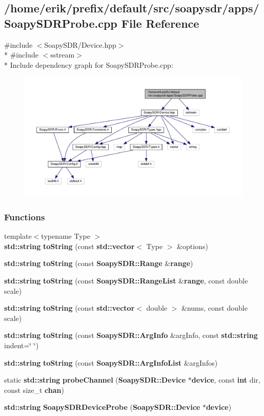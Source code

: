 \subsection{/home/erik/prefix/default/src/soapysdr/apps/\+Soapy\+S\+D\+R\+Probe.cpp File Reference}
\label{SoapySDRProbe_8cpp}
{\ttfamily \#include $<$Soapy\+S\+D\+R/\+Device.\+hpp$>$}\\*
{\ttfamily \#include $<$sstream$>$}\\*
Include dependency graph for Soapy\+S\+D\+R\+Probe.\+cpp\+:
\nopagebreak
\begin{figure}[H]
\begin{center}
\leavevmode
\includegraphics[width=350pt]{d6/d65/SoapySDRProbe_8cpp__incl}
\end{center}
\end{figure}
\subsubsection*{Functions}
\begin{DoxyCompactItemize}
\item 
{\footnotesize template$<$typename Type $>$ }\\{\bf std\+::string} {\bf to\+String} (const {\bf std\+::vector}$<$ Type $>$ \&options)
\item 
{\bf std\+::string} {\bf to\+String} (const {\bf Soapy\+S\+D\+R\+::\+Range} \&{\bf range})
\item 
{\bf std\+::string} {\bf to\+String} (const {\bf Soapy\+S\+D\+R\+::\+Range\+List} \&{\bf range}, const double scale)
\item 
{\bf std\+::string} {\bf to\+String} (const {\bf std\+::vector}$<$ double $>$ \&nums, const double scale)
\item 
{\bf std\+::string} {\bf to\+String} (const {\bf Soapy\+S\+D\+R\+::\+Arg\+Info} \&arg\+Info, const {\bf std\+::string} indent=\char`\"{}    \char`\"{})
\item 
{\bf std\+::string} {\bf to\+String} (const {\bf Soapy\+S\+D\+R\+::\+Arg\+Info\+List} \&arg\+Infos)
\item 
static {\bf std\+::string} {\bf probe\+Channel} ({\bf Soapy\+S\+D\+R\+::\+Device} $\ast${\bf device}, const {\bf int} dir, const size\+\_\+t {\bf chan})
\item 
{\bf std\+::string} {\bf Soapy\+S\+D\+R\+Device\+Probe} ({\bf Soapy\+S\+D\+R\+::\+Device} $\ast${\bf device})
\end{DoxyCompactItemize}


